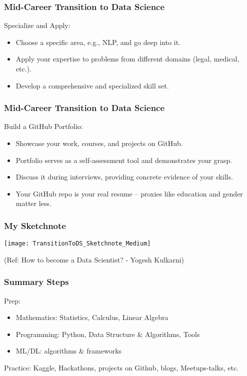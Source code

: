 \begin{frame}[fragile]\frametitle{Mid-Career Transition to Data Science}

Specialize and Apply:
        \begin{itemize}
            \item Choose a specific area, e.g., NLP, and go deep into it.
            \item Apply your expertise to problems from different domains (legal, medical, etc.).
            \item Develop a comprehensive and specialized skill set.
        \end{itemize}
			
\end{frame}

\begin{frame}[fragile]\frametitle{Mid-Career Transition to Data Science}

Build a GitHub Portfolio:
        \begin{itemize}
            \item Showcase your work, courses, and projects on GitHub.
            \item Portfolio serves as a self-assessment tool and demonstrates your grasp.
            \item Discuss it during interviews, providing concrete evidence of your skills.
            \item Your GitHub repo is your real resume – proxies like education and gender matter less.
        \end{itemize}
			
\end{frame}

\begin{frame}[fragile]\frametitle{My Sketchnote}
	
	\begin{center}
	\texttt{[image: TransitionToDS\_Sketchnote\_Medium]}
	\end{center}
{\tiny (Ref: How to become a Data Scientist? - Yogesh Kulkarni)}
\end{frame}

\begin{frame}[fragile]\frametitle{Summary Steps}

Prep:
      \begin{itemize}
			\item Mathematics: Statistics, Calculus, Linear Algebra
			\item Programming: Python, Data Structure \& Algorithms, Tools
			\item ML/DL: algorithms \& frameworks
			\end{itemize}
			
Practice: Kaggle, Hackathons, projects on Github, blogs, Meetups-talks, etc.
			
\end{frame}

